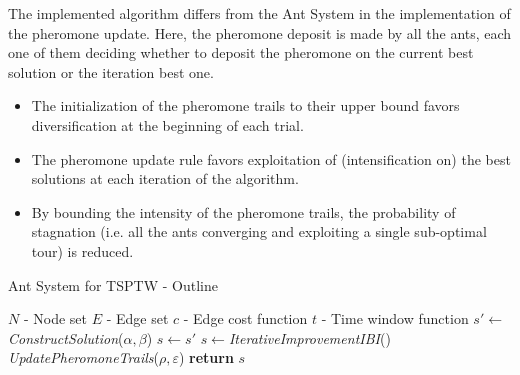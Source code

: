 \begin{homeworkProblem}
The implemented algorithm differs from the \maxmin Ant System in the implementation of the pheromone update.
Here, the pheromone deposit is made by all the ants, each one of them deciding whether to deposit the pheromone on the current best solution or the iteration best one.

\begin{itemize}
    \item The initialization of the pheromone trails to their upper bound favors diversification at the beginning of each trial.
    \item The pheromone update rule favors exploitation of (intensification on) the best solutions at each iteration of the algorithm.
    \item By bounding the intensity of the pheromone trails, the probability of stagnation (i.e. all the ants converging and exploiting a single sub-optimal tour) is reduced.
  \end{itemize}
  

\begin{algorithm}[!h]
  \caption{\maxmin Ant System for TSPTW - Outline}\label{maxmintsptw}
  \begin{algorithmic}[1]
    \Require $N$ - Node set
    \Require $E$ - Edge set 
    \Require $c$ - Edge cost function
    \Require $t$ - Time window function
        \State $s' \gets$ \emph{ConstructSolution}($\alpha,\beta$)
          \State $s \gets s' $
        \EndIf 
      \EndFor
      \State $s \gets$\emph{IterativeImprovementIBI}()
      \State \emph{UpdatePheromoneTrails}($\rho,\varepsilon$)
    \EndWhile
    \State \textbf{return} $s$
    \State
  \EndProcedure
\end{algorithmic}
\end{algorithm}

\begin{center}
  
\begin{minipage}{.45\textwidth}
\centering
{}
\end{minipage}
\end{center}
\end{homeworkProblem}

